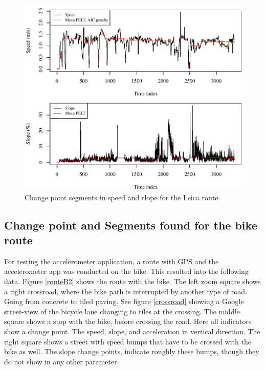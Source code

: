 \begin{figure}[!hb]
\includegraphics[width=\textwidth]{img/R_comparisonMethodsLeica.pdf}
\centering
\caption{Change point segments in speed and slope for the Leica route\label{routeLeica}}
\end{figure} 


\clearpage

\subsection{Change point and Segments found for the bike route}
For testing the accelerometer application, a route with GPS and the accelerometer app was conducted on the bike. This resulted into the following data. Figure \ref{routeB2} shows the route with the bike. The left zoom square shows a right crossroad, where the bike path is interrupted by another type of road. Going from concrete to tiled paving. See figure \ref{crossroad} showing a Google street-view of the bicycle lane changing to tiles at the crossing. The middle square shows a stop with the bike, before crossing the road. Here all indicators show a change point. The speed, slope, and acceleration in vertical direction. The right square shows a street with speed bumps that have to be crossed with the bike as well. The slope change points, indicate roughly these bumps, though they do not show in any other parameter. 

